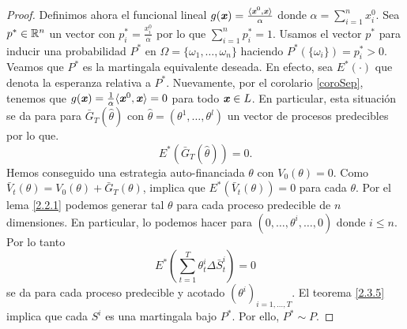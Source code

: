 \begin{proof}
	Definimos ahora el funcional lineal $ g(\textbf{\emph{x}}) = \frac{\langle \textbf{\emph{x}}^0, \textbf{\emph{x}}\rangle}{\alpha} $ donde $ \alpha = \sum_{i=1}^{n} x^0_i$. Sea $ p^* \in \mathbb{R}^n$ un vector con $ p^*_i = \frac{x_i^0}{\alpha} $ por lo que $ \sum_{i=1}^{n} p^*_i = 1 $. Usamos el vector $ p^* $ para inducir una probabilidad $ P^* $ en $ \Omega = \{\omega_1,\dots,\omega_n\} $ haciendo $ P^*(\{\omega_i\}) = p^*_{i} > 0 $. Veamos que $ P^* $ es la martingala equivalente deseada. En efecto, sea $ E^*(\cdot) $ que denota la esperanza relativa a $ P^* $. Nuevamente, por el corolario \ref{coroSep}, tenemos que $ g(\textbf{\emph{x}}) = \frac{1}{\alpha}\langle \textbf{\emph{x}}^0,\textbf{\emph{x}}\rangle = 0$ para todo $ \textbf{\emph{x}}\in L $. En particular, esta situación se da para  para $ \bar{G}_T (\hat{\theta}) $ con $ \hat{\theta}=(\theta^1,\dots,\theta^l) $ un vector de procesos predecibles por lo que.
	\[ E^*(\bar{G}_T (\hat{\theta})) = 0.\]
	Hemos conseguido una estrategia auto-financiada $ \theta $ con $ V_0(\theta) = 0 $. Como $ \bar{V}_t (\theta) = V_0(\theta) + \bar{G}_T (\theta)$, implica que $ E^*(\bar{V}_t (\theta)) = 0 $ para cada $ \theta $. Por el lema \ref{2.2.1} podemos generar tal $ \theta $ para cada proceso predecible de $ n $  dimensiones. En particular, lo podemos hacer para $ (0,\dots, \theta^i,\dots,0) $ donde $ i\leq n $. Por lo tanto
	\[
	E^*(\sum_{t=1}^{T}\theta_t^i\Delta \bar{S}^i_t) = 0
	\]
	se da para cada proceso predecible y acotado $ (\theta^i)_{i=1,\dots,T} $. El teorema \ref{2.3.5} implica que cada $ S^i $ es una martingala bajo $ P^* $. Por ello, $ P^* \sim P $.
\end{proof}
\bigskip